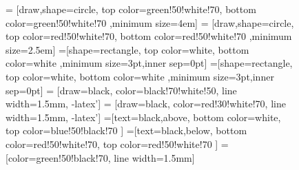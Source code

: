 \documentclass[10pt,letterpaper]{article}
\begin{document}
\begin{figure}[h]
\centering
{} = [draw,shape=circle, top color=green!50!white!70, bottom color=green!50!white!70 ,minimum size=4em]
 = [draw,shape=circle, top color=red!50!white!70, bottom color=red!50!white!70 ,minimum size=2.5em]
\def\radius{.7mm} 
=[shape=rectangle, top color=white, bottom color=white ,minimum size=3pt,inner sep=0pt]
=[shape=rectangle, top color=white, bottom color=white ,minimum size=3pt,inner sep=0pt]
\def\n{11}
  = [draw=black, color=black!70!white!50, line width=1.5mm, -latex'] 
  = [draw=black, color=red!30!white!70, line width=1.5mm, -latex']
=[text=black,above, bottom color=white, top color=blue!50!black!70  ]
=[text=black,below, bottom color=red!50!white!70, top color=red!50!white!70  ]
  = [color=green!50!black!70, line width=1.5mm]
\def\names{{"$O_{1,1}$","...","$O_{1,d_1}$", "...","$O_{n, 1}$", "...", "$O_{n, d_n}$"}}%
\end{figure}
\end{document}
